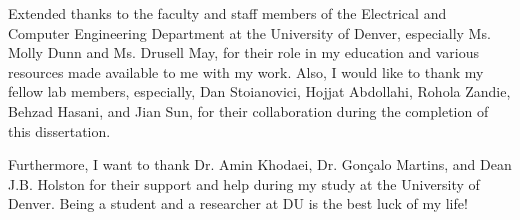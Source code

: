 \vspace{3mm}
Extended thanks to the faculty and staff members of the Electrical and Computer Engineering Department at the University of Denver, especially Ms. Molly Dunn and Ms. Drusell May, for their role in my education and various resources made available to me with my work. Also, I would like to thank my fellow lab members, especially, Dan Stoianovici, Hojjat Abdollahi, Rohola Zandie, Behzad Hasani, and Jian Sun, for their collaboration during the completion of this dissertation.

\vspace{3mm}
Furthermore, I want to thank Dr. Amin Khodaei, Dr. Gonçalo Martins, and Dean J.B. Holston for their support and help during my study at the University of Denver. Being a student and a researcher at DU is the best luck of my life!